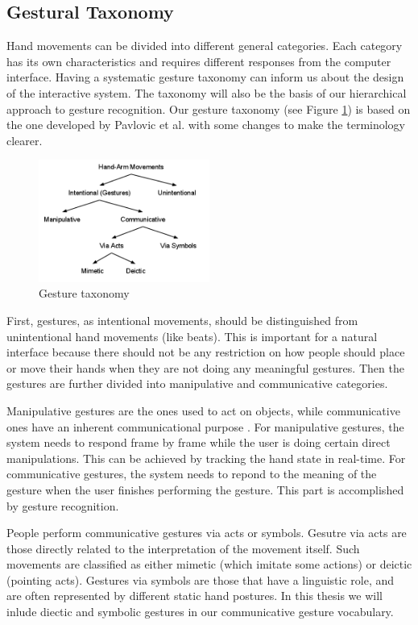 \subsection{Gestural Taxonomy}\label{sec:taxonomy}
Hand movements can be divided into different general categories. Each
category has its own characteristics and requires different responses from
the computer interface. Having a systematic gesture taxonomy can inform
us about the design of the interactive system. The taxonomy will also be the
basis of our hierarchical approach to gesture recognition. Our gesture taxonomy (see
Figure \ref{fig:taxonomy}) is based on the one developed by Pavlovic et al.
\cite{Pavlovic97} with some changes to make the terminology clearer.

\begin{figure}[h]
  \centering
  \includegraphics[width=0.5\textwidth]{figures/taxonomy.png} 
  \caption{Gesture taxonomy}
  \label{fig:taxonomy}
\end{figure}

First, gestures, as intentional movements, should be distinguished from
unintentional hand movements (like beats). This is important for a natural
interface because there should not be any restriction on how people should
place or move their hands when they are not doing any meaningful gestures. Then
the gestures are further divided into manipulative and communicative categories.

Manipulative gestures are the ones used to act on objects, while communicative 
ones have an inherent communicational purpose \cite{Pavlovic97}. For
manipulative gestures, the system needs to respond frame by frame while the user is doing
certain direct manipulations. This can be achieved by tracking the hand
state in real-time. For communicative gestures, the system needs to repond to
the meaning of the gesture when the user finishes performing the gesture. This part is
accomplished by gesture recognition. 

People perform communicative gestures via acts or symbols. Gesutre via acts are
those directly related to the interpretation of the movement itself. Such
movements are classified as either mimetic (which imitate some actions) or deictic (pointing acts). 
Gestures via symbols are those that have a linguistic role, and are
often represented by different static hand postures. In this thesis we will
inlude diectic and symbolic gestures in our communicative gesture vocabulary.

